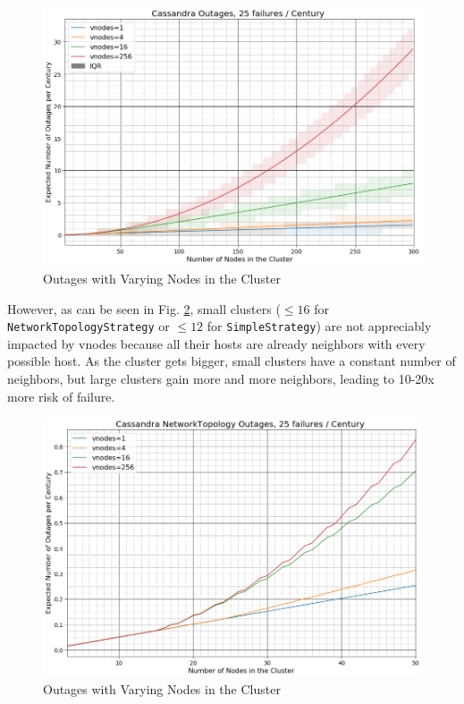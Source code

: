 \documentclass{article}
\begin{document}
\begin{figure}[h!]
    \centering
    \includegraphics[width=1.0\textwidth]{images/outages_nodes.png}
    \caption{Outages with Varying Nodes in the Cluster}
    \label{fig:outages_nodes}
\end{figure}

However, as can be seen in Fig. \ref{fig:outages_nodes_small}, small clusters
($\leq16$ for \texttt{NetworkTopologyStrategy} or $\leq12$ for
\texttt{SimpleStrategy}) are not appreciably impacted by vnodes because all their
hosts are already neighbors with every possible host. As the cluster gets bigger,
small clusters have a constant number of neighbors, but large clusters gain more
and more neighbors, leading to 10-20x more risk of failure.

\begin{figure}[H]
    \centering
    \includegraphics[width=1.0\textwidth]{images/outages_nodes_small.png}
    \caption{Outages with Varying Nodes in the Cluster}
    \label{fig:outages_nodes_small}
\end{figure}
\end{document}
